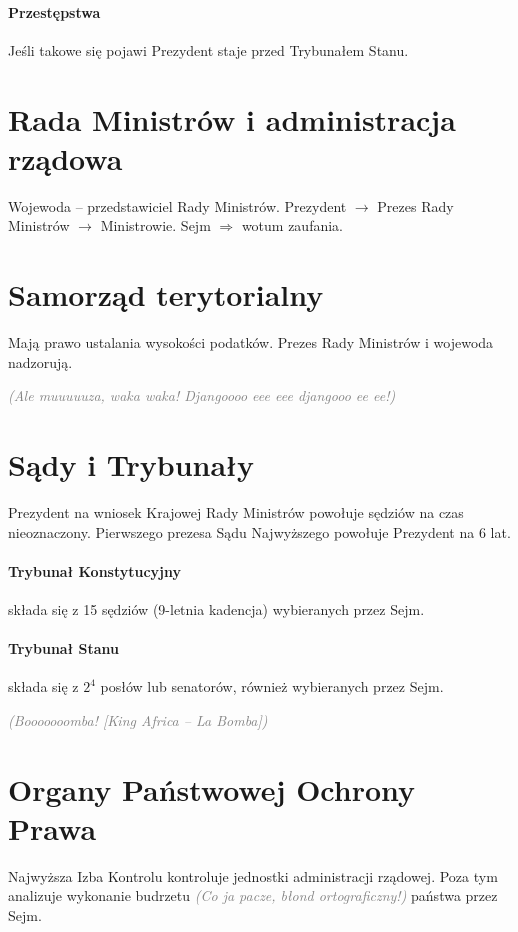 \documentclass [a4paper, 12pt, oneside]{article}
\newcommand{\comment}[1]{\textcolor{Gray}{\textsf{\emph{(#1)}}}}
\begin{document}
    \paragraph{Przestępstwa} Jeśli takowe się pojawi Prezydent staje przed Trybunałem Stanu.

\section{Rada Ministrów i administracja rządowa} %
\label{sec:rada_ministr_w_i_administracja_rz_dowa}
    Wojewoda -- przedstawiciel Rady Ministrów. Prezydent $\rightarrow$ Prezes Rady Ministrów $\rightarrow$ Ministrowie. Sejm $\Rightarrow$ wotum zaufania.

\section{Samorząd terytorialny} %
\label{sec:samorz_d_terytorialny}
    Mają prawo ustalania wysokości podatków. Prezes Rady Ministrów i wojewoda nadzorują.

\comment{Ale muuuuuza, waka waka! Djangoooo eee eee djangooo ee ee!}

\section{Sądy i Trybunały} %
\label{sec:s_dy_i_trybuna_y}
    Prezydent na wniosek Krajowej Rady Ministrów powołuje sędziów na czas nieoznaczony. Pierwszego prezesa Sądu Najwyższego powołuje Prezydent na 6 lat.

    \paragraph{Trybunał Konstytucyjny} składa się z 15 sędziów (9-letnia kadencja) wybieranych przez Sejm.

    \paragraph{Trybunał Stanu} składa się z $2^4$ posłów lub senatorów, również wybieranych przez Sejm.

\comment{Booooooomba! [King Africa -- La Bomba]}

\section{Organy Państwowej Ochrony Prawa} %
\label{sec:organy_pa_stwowej_ochrony_prawa}
    Najwyższa Izba Kontrolu kontroluje jednostki administracji rządowej. Poza tym analizuje wykonanie budrzetu \comment{Co ja pacze, błond ortograficzny!} państwa przez Sejm.
\end{document}
